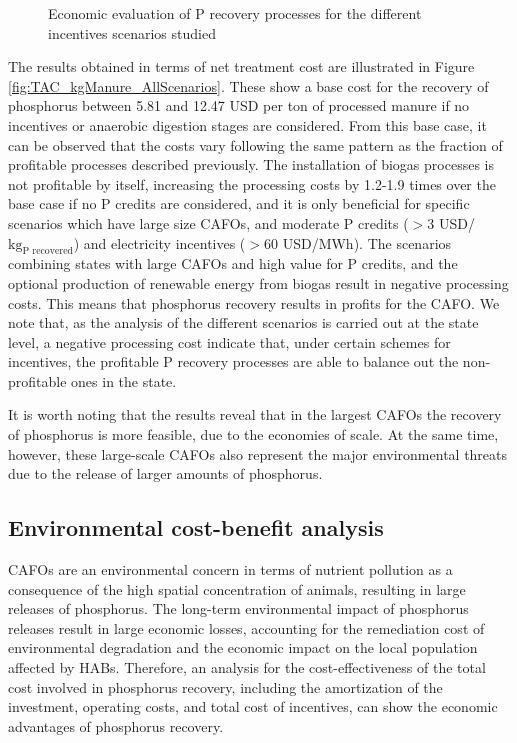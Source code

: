 \begin{refsection}[referencesCh5]
\begin{figure}[h!]
	\caption{Economic evaluation of P recovery processes for the different incentives scenarios studied}
	\label{fig:AllScenarios}
\end{figure}

The results obtained in terms of net treatment cost are illustrated in Figure \ref{fig:TAC_kgManure_AllScenarios}. These  show a base cost for the recovery of phosphorus between 5.81 and 12.47 USD per ton of processed manure if no incentives or anaerobic digestion stages are considered. From this base case, it can be observed that the costs vary following the same pattern as the fraction of profitable processes described previously. The installation of biogas processes is not profitable by itself, increasing the processing costs by 1.2-1.9 times over the base case if no P credits are considered, and it is only beneficial for specific scenarios which have large size CAFOs, and moderate P credits ($>$3 USD/${\text{kg}_\text{P recovered}}$) and electricity incentives ($>$60 USD/MWh). The scenarios combining states with large CAFOs and high value for P credits, and the optional production of renewable energy from biogas result in negative processing costs. This means that phosphorus recovery results in profits for the CAFO. We note that, as the analysis of the different scenarios is carried out at the state level, a negative processing cost indicate that, under certain schemes for incentives, the profitable P recovery processes are able to balance out the non-profitable ones in the state.

It is worth noting that the results reveal that in the largest CAFOs the recovery of phosphorus is more feasible, due to the economies of scale. At the same time, however, these large-scale CAFOs also represent the major environmental threats due to the release of larger amounts of phosphorus.

\subsection{Environmental cost-benefit analysis}
CAFOs are an environmental concern in terms of nutrient pollution as a consequence of the high spatial concentration of animals, resulting in large releases of phosphorus. 
The long-term environmental impact of phosphorus releases result in large economic losses, accounting for the remediation cost of environmental degradation and the economic impact on the local population affected by HABs. Therefore, an analysis for the cost-effectiveness of the total cost involved in phosphorus recovery, including the amortization of the investment, operating costs, and total cost of incentives, can show the economic advantages of phosphorus recovery. 


\end{refsection}
